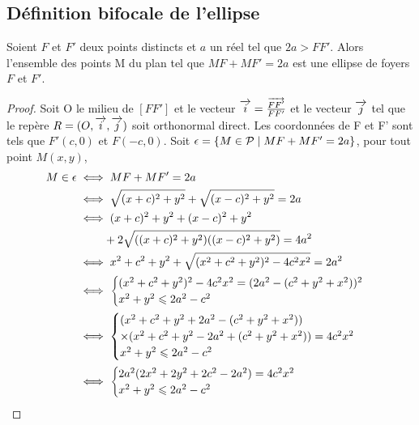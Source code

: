 \subsection{Définition bifocale de l'ellipse}
\begin{prop}
  \label{prop:bifellipse}
  Soient \(F\) et \(F'\) deux points distincts et \(a\) un réel tel que 
  \(2a>FF'\). Alors l'ensemble des points M du plan tel que \(MF + MF' = 2a\) est 
  une ellipse de foyers \(F\) et \(F'\).
\end{prop}
\begin{proof}
  Soit O le milieu de \([FF']\) et le vecteur \(\overrightarrow{i} = \frac{\overrightarrow{FF'}}{FF'}\) et 
  le vecteur \(\overrightarrow{j}\) tel que le repère \(R = (O,\overrightarrow{i},\overrightarrow{j})\) soit orthonormal direct. Les 
  coordonnées de F et F' sont tels que \(F'(c, 0)\) et \(F(-c, 0)\). Soit 
  \(\epsilon = \left\{M \in \mathcal{P}\mathrel{}\middle|\mathrel{}MF + MF' = 2a\right\}\), pour tout point \(M(x, y)\),
  \begin{align}
    M \in \epsilon & \iff MF + MF' = 2a \\
                   & \iff \sqrt{(x + c)^2 + y^2} + \sqrt{(x-c)^2 + y^2} = 2a \\
                   & \iff (x + c)^2 + y^2 + (x-c)^2 + y^2 \notag \\
                   & \phantom{\iff} + 2\sqrt{((x + c)^2 + y^2)((x-c)^2 + y^2)} = 4a^2 
                   \label{eq:tag:1}\\
                   & \iff x^2 + c^2 + y^2 + \sqrt{(x^2 + c^2 + y^2)^2-4c^2x^2} = 2a^2\\
                   & \iff \begin{cases} (x^2 + c^2 + y^2)^2-4c^2x^2 = 
                     (2a^2-(c^2 + y^2 + x^2))^2 \\ x^2 + y^2 \leqslant 2a^2 
                   -c^2\\\end{cases}\\
                   & \iff \begin{cases} (x^2 + c^2 + y^2 + 2a^2-(c^2 + y^2 + x^2)) \\ 
                     \times (x^2 + c^2 + y^2 - 2a^2 + (c^2 + y^2 + x^2)) = 4c^2x^2  \\ x^2 + y^2 
                   \leqslant 2a^2 -c^2\end{cases}\\
                   & \iff \begin{cases} 2a^2(2x^2 + 2y^2 + 2c^2-2a^2) = 4c^2x^2  \\ 
                   x^2 + y^2 \leqslant 2a^2 -c^2\end{cases}\\

\end{align}
\end{proof}
